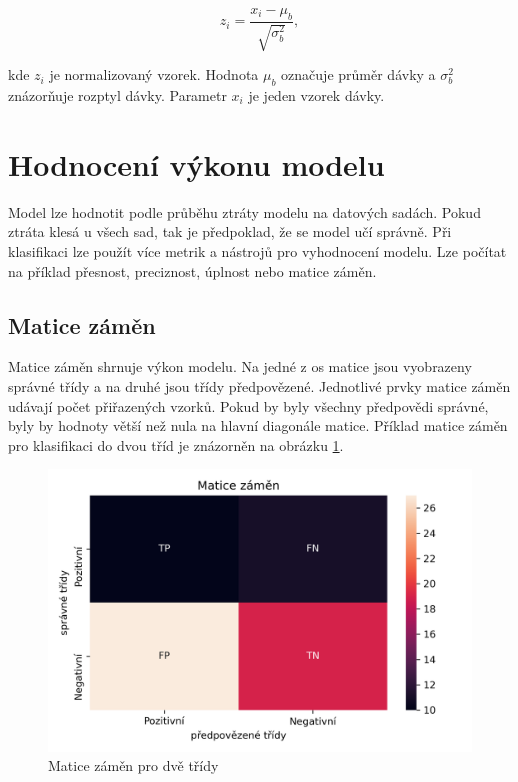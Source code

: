 \documentclass[FM,BP]{tulthesis}
\begin{document}
\begin{equation}
\label{eqn:batch_mean}
z_i = \frac{x_i - \mu_b}{\sqrt{\sigma^2_b}},
\end{equation}

kde $ z_i $ je normalizovaný vzorek. Hodnota $ \mu_b $ označuje průměr dávky a $ \sigma^2_b $ znázorňuje rozptyl dávky. Parametr $ x_i $ je jeden vzorek dávky.

\section{Hodnocení výkonu modelu} %
Model lze hodnotit podle průběhu ztráty modelu na datových sadách. Pokud ztráta klesá u všech sad, tak je předpoklad, že se model učí správně. Při klasifikaci lze použít více metrik a nástrojů pro vyhodnocení modelu. Lze počítat na příklad přesnost, preciznost, úplnost nebo matice záměn.

\subsection{Matice záměn} %
Matice záměn shrnuje výkon modelu. Na jedné z os matice jsou vyobrazeny správné třídy a na druhé jsou třídy předpovězené. Jednotlivé prvky matice záměn udávají počet přiřazených vzorků. Pokud by byly všechny předpovědi správné, byly by hodnoty větší než nula na hlavní diagonále matice. Příklad matice záměn pro klasifikaci do dvou tříd je znázorněn na obrázku \ref{fig:conf_matrix-example}.

\begin{figure}[h]
\centerline{\includegraphics[scale=.7]{conf_matrix-example.png}}
\caption{Matice záměn pro dvě třídy}
\label{fig:conf_matrix-example}
\end{figure}
\FloatBarrier
\end{document}
